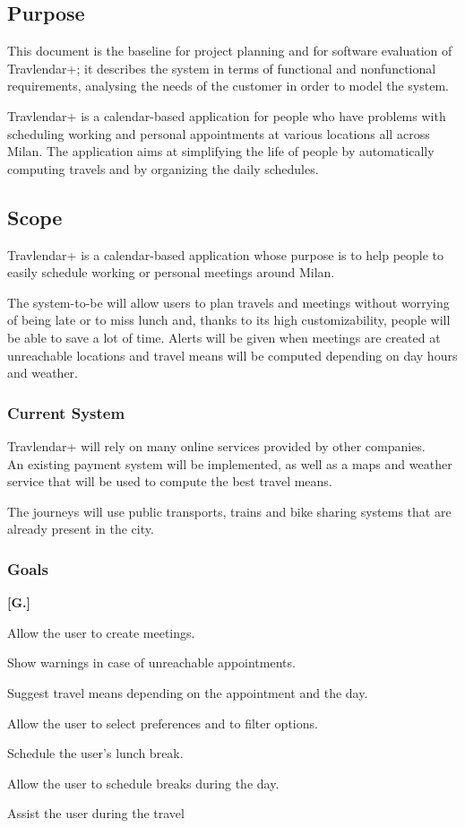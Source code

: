 \subsection{Purpose}
This document is the baseline for project planning and for software evaluation of Travlendar+; it describes the system in terms of functional and nonfunctional requirements, analysing the needs of the customer in order to model the system.

Travlendar+ is a calendar-based application for people who have problems with scheduling working and personal appointments at various locations all across Milan. The application aims at simplifying the life of people by automatically computing travels and by organizing the daily schedules.

\subsection{Scope}
Travlendar+ is a calendar-based application whose purpose is to help people to easily schedule working or personal meetings around Milan.

The system-to-be will allow users to plan travels and meetings without worrying of being late or to miss lunch and, thanks to its high customizability, people will be able to save a lot of time. Alerts will be given when meetings are created at unreachable locations and travel means will be computed depending on day hours and weather.

\subsubsection{Current System}
Travlendar+ will rely on many online services provided by other companies.\\
An existing payment system will be implemented, as well as a maps and weather service that will be used to compute the best travel means.

The journeys will use public transports, trains and bike sharing systems that are already present in the city.

\subsubsection{Goals}
\begin{list}
{\bfseries{}[G.]~}
{
}
\item
Allow the user to create meetings.
\item
Show warnings in case of unreachable appointments.
\item
Suggest travel means depending on the appointment and the day.
\item
Allow the user to select preferences and to filter options.
\item
Schedule the user’s lunch break.
\item
Allow the user to schedule breaks during the day.
\item
Assist the user during the travel

\end{list}

